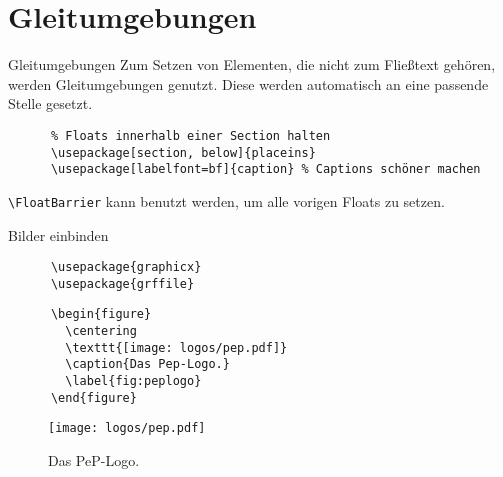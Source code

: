 \section{Gleitumgebungen}

\begin{frame}[fragile]{Gleitumgebungen}
  Zum Setzen von Elementen, die nicht zum Fließtext gehören, werden Gleitumgebungen genutzt.
  Diese werden automatisch an eine passende Stelle gesetzt.

  \begin{Packages}
    \begin{lstlisting}
      % Floats innerhalb einer Section halten
      \usepackage[section, below]{placeins}
      \usepackage[labelfont=bf]{caption} % Captions schöner machen
    \end{lstlisting}
  \end{Packages}

  \lstinline+\FloatBarrier+ kann benutzt werden, um alle vorigen Floats zu setzen.
\end{frame}

\begin{frame}[fragile]{Bilder einbinden}
  \begin{Packages}
    \begin{lstlisting}
      \usepackage{graphicx}
      \usepackage{grffile}
    \end{lstlisting}
  \end{Packages}
  \begin{CodeExample}{0.60}
    \begin{lstlisting}
      \begin{figure}
        \centering
        \texttt{[image: logos/pep.pdf]}
        \caption{Das Pep-Logo.}
        \label{fig:peplogo}
      \end{figure}
    \end{lstlisting}
  \CodeResult
    \begin{figure}
      \centering
      \texttt{[image: logos/pep.pdf]}
      \caption{Das PeP-Logo.}
      \label{fig:peplogo}
    \end{figure}
  \end{CodeExample}
\end{frame}

